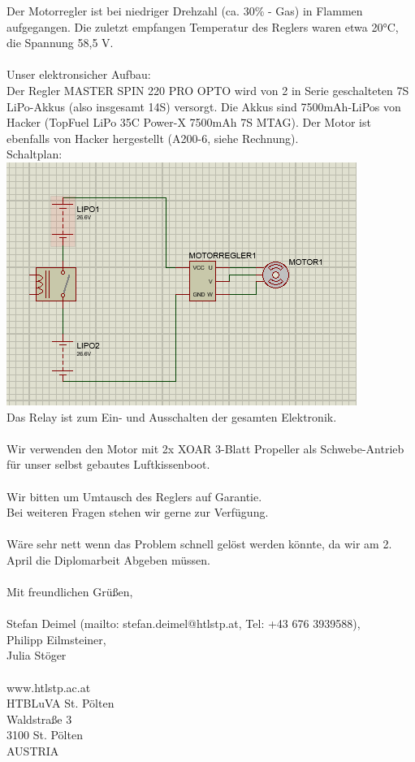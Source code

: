 \documentclass[12pt,a4paper,fleqn,liststotocnumbered,bibtotocnumbered]{scrartcl}
\begin{document}
Der Motorregler ist bei niedriger Drehzahl (ca. 30\% - Gas) in Flammen aufgegangen. Die zuletzt empfangen Temperatur des Reglers waren etwa 20°C, die Spannung 58,5 V.
\\\\
Unser elektronsicher Aufbau:\\
Der Regler MASTER SPIN 220 PRO OPTO wird von 2 in Serie geschalteten 7S LiPo-Akkus (also insgesamt 14S) versorgt. Die Akkus sind 7500mAh-LiPos von Hacker (TopFuel LiPo 35C Power-X 7500mAh 7S MTAG). Der Motor ist ebenfalls von Hacker hergestellt (A200-6, siehe Rechnung).\\
Schaltplan:\\
{\includegraphics[width=.7\textwidth]{2021-02-22-21-04-18.png}}\\
Das Relay ist zum Ein- und Ausschalten der gesamten Elektronik.\\
\\
Wir verwenden den Motor mit 2x XOAR 3-Blatt Propeller als Schwebe-Antrieb für unser selbst gebautes Luftkissenboot.\\
\\
Wir bitten um Umtausch des Reglers auf Garantie.\\
Bei weiteren Fragen stehen wir gerne zur Verfügung.\\
\\
Wäre sehr nett wenn das Problem schnell gelöst werden könnte, da wir am 2. April die Diplomarbeit Abgeben müssen.\\
\\
Mit freundlichen Grüßen,\\
\\
Stefan Deimel (mailto: stefan.deimel@htlstp.at, Tel: +43 676 3939588),\\
Philipp Eilmsteiner,\\
Julia Stöger\\
\\
www.htlstp.ac.at\\
HTBLuVA St. Pölten\\
Waldstraße 3\\
3100 St. Pölten\\
AUSTRIA
\end{document}
